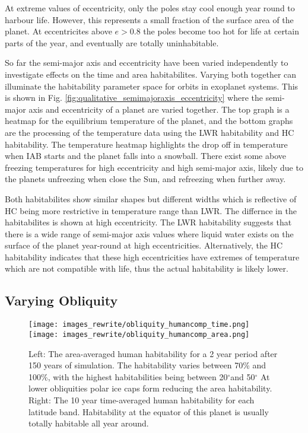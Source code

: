 \documentclass[12pt, onecolumn]{revtex4-2}    %
\newcommand{\degrees}{\ensuremath{^{\circ}}}
\begin{document}
At extreme values of eccentricity, only the poles stay cool enough year round to harbour life.
However, this represents a small fraction of the surface area of the planet.
At eccentricites above $e > 0.8$ the poles become too hot for life at certain parts of the year, and eventually are totally uninhabitable.


So far the semi-major axis and eccentricity have been varied independently to investigate effects on the time and area habitabilites.
Varying both together can illuminate the habitability parameter space for orbits in exoplanet systems.
This is shown in Fig. \ref{fig:qualitative_semimajoraxis_eccentricity} where the semi-major axis and eccentricity of a planet are varied together.
The top graph is a heatmap for the equilibrium temperature of the planet, and the bottom graphs are the processing of the temperature data using the LWR habitability and HC habitability.
The temperature heatmap highlights the drop off in temperature when IAB starts and the planet falls into a snowball.
There exist some above freezing temperatures for high eccentricity and high semi-major axis, likely due to the planets unfreezing when close the Sun, and refreezing when further away.

Both habitabilites show similar shapes but different widths which is reflective of HC being more restrictive in temperature range than LWR.
The differnce in the habitabilites is shown at high eccentricity.
The LWR habitability suggests that there is a wide range of semi-major axis values where liquid water exists on the surface of the planet year-round at high eccentricities.
Alternatively, the HC habitability indicates that these high eccentricities have extremes of temperature which are not compatible with life, thus the actual habitability is likely lower.

\subsection{Varying Obliquity} \label{ssec:qualitative_obliquity}
%
\begin{figure}[t]
  \texttt{[image: images\_rewrite/obliquity\_humancomp\_time.png]}
  \texttt{[image: images\_rewrite/obliquity\_humancomp\_area.png]}
  \caption{
    Left: The area-averaged human habitability for a 2 year period after 150 years of simulation.
    The habitability varies between 70\% and 100\%, with the highest habitabilities being between 20\degrees and 50\degrees
    At lower obliquities polar ice caps form reducing the area habitability.
    Right: The 10 year time-averaged human habitability for each latitude band.
    Habitability at the equator of this planet is usually totally habitable all year around.
  }
  \label{fig:qualitative_obliquity}
\end{figure}
\end{document}
